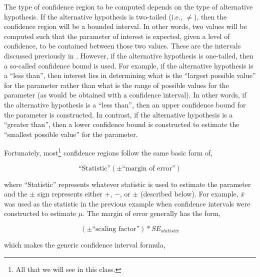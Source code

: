 \documentclass[10pt,openany]{book}\usepackage[]{graphicx}\usepackage[]{color}
\begin{document}

The type of confidence region to be computed depends on the type of alternative hypothesis.  If the alternative hypothesis is two-tailed (i.e., $\neq$), then the confidence region will be a bounded interval.  In other words, two values will be computed such that the parameter of interest is expected, given a level of confidence, to be contained between those two values.  These are the intervals discussed previously in .  However, if the alternative hypothesis is one-tailed, then a so-called confidence bound is used.  For example, if the alternative hypothesis is a ``less than'', then interest lies in determining what is the ``largest possible value'' for the parameter rather than what is the range of possible values for the parameter (as would be obtained with a confidence interval).  In other words, if the alternative hypothesis is a ``less than'', then an upper confidence bound for the parameter is constructed.  In contrast, if the alternative hypothesis is a ``greater than'', then a lower confidence bound is constructed to estimate the ``smallest possible value'' for the parameter.



Fortunately, most\footnote{All that we will see in this class.} confidence regions follow the same basic form of, 

  \[ \text{``Statistic''} (\pm \text{``margin of error''}) \]

where ``Statistic'' represents whatever statistic is used to estimate the parameter and the $\pm$ sign represents either $+$, $-$, or $\pm$ (described below).  For example, $\bar{x}$ was used as the statistic in the previous example when confidence intervals were constructed to estimate $\mu$.  The margin of error generally has the form,

  \[ (\pm \text{``scaling factor''}) * SE_{statistic} \]

which makes the generic confidence interval formula,
\end{document}
